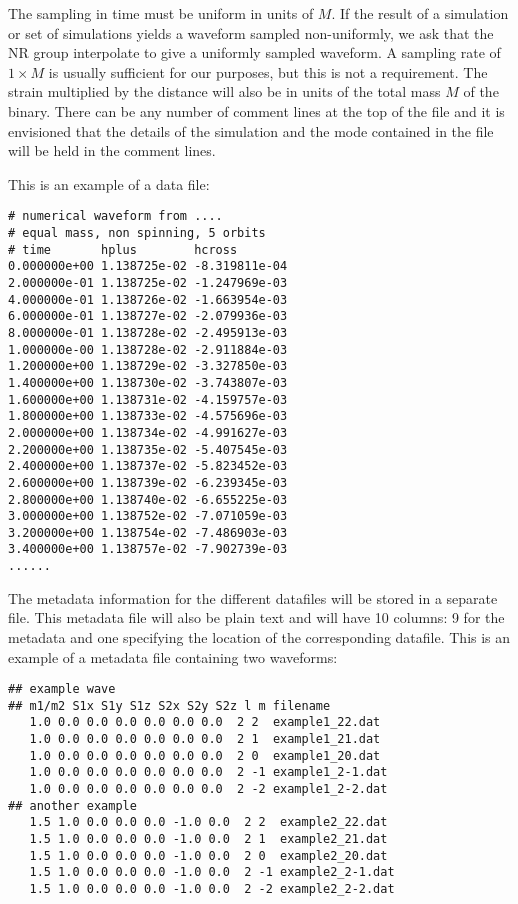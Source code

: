 \documentclass[10pt]{ligodcc}
\begin{document}
The sampling in time must be uniform in units of $M$.  If the result
of a simulation or set of simulations yields a waveform sampled
non-uniformly, we ask that the NR group interpolate to give a
uniformly sampled waveform.  A sampling rate of $1\times M$ is usually
sufficient for our purposes, but this is not a requirement.  The
strain multiplied by the distance will also be in units of the total
mass $M$ of the binary.  There can be any number of comment lines at
the top of the file and it is envisioned that the details of the
simulation and the mode contained in the file will be held in the
comment lines.  

This is an example of a data file:

\begin{verbatim}
# numerical waveform from ....
# equal mass, non spinning, 5 orbits
# time       hplus        hcross
0.000000e+00 1.138725e-02 -8.319811e-04
2.000000e-01 1.138725e-02 -1.247969e-03
4.000000e-01 1.138726e-02 -1.663954e-03
6.000000e-01 1.138727e-02 -2.079936e-03
8.000000e-01 1.138728e-02 -2.495913e-03
1.000000e-00 1.138728e-02 -2.911884e-03
1.200000e+00 1.138729e-02 -3.327850e-03
1.400000e+00 1.138730e-02 -3.743807e-03
1.600000e+00 1.138731e-02 -4.159757e-03
1.800000e+00 1.138733e-02 -4.575696e-03
2.000000e+00 1.138734e-02 -4.991627e-03
2.200000e+00 1.138735e-02 -5.407545e-03
2.400000e+00 1.138737e-02 -5.823452e-03
2.600000e+00 1.138739e-02 -6.239345e-03
2.800000e+00 1.138740e-02 -6.655225e-03
3.000000e+00 1.138752e-02 -7.071059e-03
3.200000e+00 1.138754e-02 -7.486903e-03
3.400000e+00 1.138757e-02 -7.902739e-03
......
\end{verbatim}

The metadata information for the different datafiles will be stored in
a separate file.  This metadata file will also be plain text and
will have 10 columns: 9 for the metadata and one specifying
the location of the corresponding datafile.  This is an example of a
metadata file containing two waveforms:
\begin{verbatim}
## example wave
## m1/m2 S1x S1y S1z S2x S2y S2z l m filename
   1.0 0.0 0.0 0.0 0.0 0.0 0.0  2 2  example1_22.dat
   1.0 0.0 0.0 0.0 0.0 0.0 0.0  2 1  example1_21.dat
   1.0 0.0 0.0 0.0 0.0 0.0 0.0  2 0  example1_20.dat
   1.0 0.0 0.0 0.0 0.0 0.0 0.0  2 -1 example1_2-1.dat
   1.0 0.0 0.0 0.0 0.0 0.0 0.0  2 -2 example1_2-2.dat
## another example
   1.5 1.0 0.0 0.0 0.0 -1.0 0.0  2 2  example2_22.dat
   1.5 1.0 0.0 0.0 0.0 -1.0 0.0  2 1  example2_21.dat
   1.5 1.0 0.0 0.0 0.0 -1.0 0.0  2 0  example2_20.dat
   1.5 1.0 0.0 0.0 0.0 -1.0 0.0  2 -1 example2_2-1.dat
   1.5 1.0 0.0 0.0 0.0 -1.0 0.0  2 -2 example2_2-2.dat
\end{verbatim}
\end{document}
